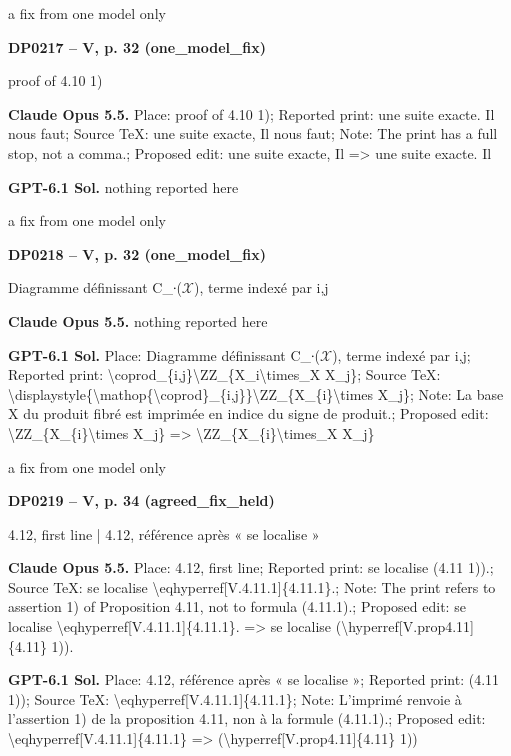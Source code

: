 a fix from one model only\par
\par\noindent\hypertarget{DP0217}{}\textbf{DP0217 -- V, p. 32 (one\_model\_fix)}\par
proof of 4.10 1)\par
\textbf{Claude Opus 5.5.} Place: proof of 4.10 1); Reported print: une suite exacte. Il nous faut; Source TeX: une suite exacte, Il nous faut; Note: The print has a full stop, not a comma.; Proposed edit: une suite exacte, Il =\allowbreak > une suite exacte. Il\par
\textbf{GPT-6.1 Sol.} nothing reported here\par
a fix from one model only\par
\par\noindent\hypertarget{DP0218}{}\textbf{DP0218 -- V, p. 32 (one\_model\_fix)}\par
Diagramme définissant C\_∙(\ensuremath{𝒳}), terme indexé par i,j\par
\textbf{Claude Opus 5.5.} nothing reported here\par
\textbf{GPT-6.1 Sol.} Place: Diagramme définissant C\_∙(\ensuremath{𝒳}), terme indexé par i,j; Reported print: \textbackslash{}coprod\_\{i,j\}\textbackslash{}ZZ\_\{X\_i\textbackslash{}times\_X X\_j\}; Source TeX: \textbackslash{}displaystyle\{\textbackslash{}mathop\{\textbackslash{}coprod\}\_\{i,j\}\}\textbackslash{}ZZ\_\{X\_\{i\}\textbackslash{}times X\_j\}; Note: La base X du produit fibré est imprimée en indice du signe de produit.; Proposed edit: \textbackslash{}ZZ\_\{X\_\{i\}\textbackslash{}times X\_j\} =\allowbreak > \textbackslash{}ZZ\_\{X\_\{i\}\textbackslash{}times\_X X\_j\}\par
a fix from one model only\par
\par\noindent\hypertarget{DP0219}{}\textbf{DP0219 -- V, p. 34 (agreed\_fix\_held)}\par
4.12, first line | 4.12, référence après « se localise »\par
\textbf{Claude Opus 5.5.} Place: 4.12, first line; Reported print: se localise (4.11 1)).; Source TeX: se localise \textbackslash{}eqhyperref[V.4.11.1]\{4.11.1\}.; Note: The print refers to assertion 1) of Proposition 4.11, not to formula (4.11.1).; Proposed edit: se localise \textbackslash{}eqhyperref[V.4.11.1]\{4.11.1\}. =\allowbreak > se localise (\textbackslash{}hyperref[V.prop4.11]\{4.11\} 1)).\par
\textbf{GPT-6.1 Sol.} Place: 4.12, référence après « se localise »; Reported print: (4.11 1)); Source TeX: \textbackslash{}eqhyperref[V.4.11.1]\{4.11.1\}; Note: L'imprimé renvoie à l'assertion 1) de la proposition 4.11, non à la formule (4.11.1).; Proposed edit: \textbackslash{}eqhyperref[V.4.11.1]\{4.11.1\} =\allowbreak > (\textbackslash{}hyperref[V.prop4.11]\{4.11\} 1))\par

